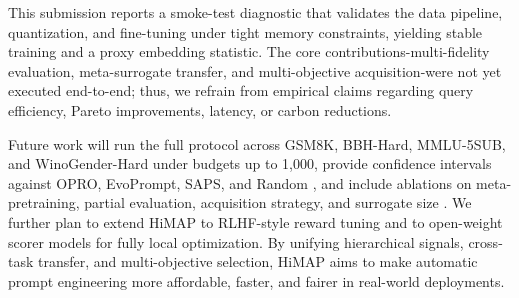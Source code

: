 \documentclass{article}
\begin{document}
This submission reports a smoke-test diagnostic that validates the data pipeline, quantization, and fine-tuning under tight memory constraints, yielding stable training and a proxy embedding statistic. The core contributions-multi-fidelity evaluation, meta-surrogate transfer, and multi-objective acquisition-were not yet executed end-to-end; thus, we refrain from empirical claims regarding query efficiency, Pareto improvements, latency, or carbon reductions.

Future work will run the full protocol across GSM8K, BBH-Hard, MMLU-5SUB, and WinoGender-Hard under budgets up to 1,000, provide confidence intervals against OPRO, EvoPrompt, SAPS, and Random \cite{yang-2023-large}, and include ablations on meta-pretraining, partial evaluation, acquisition strategy, and surrogate size \cite{lin-2023-use,chen-2023-instructzero,wen-2023-hard}. We further plan to extend HiMAP to RLHF-style reward tuning and to open-weight scorer models for fully local optimization. By unifying hierarchical signals, cross-task transfer, and multi-objective selection, HiMAP aims to make automatic prompt engineering more affordable, faster, and fairer in real-world deployments.




\end{document}
